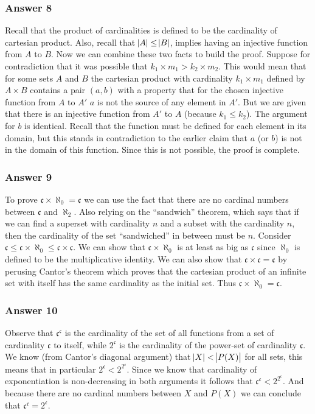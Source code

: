 \documentclass[11pt]{article}
\begin{document}
\subsubsection{Answer 8}
\label{sec-1-4-1}
Recall that the product of cardinalities is defined to be the cardinality of
cartesian product.  Also, recall that $\abs{A} \leq \abs{B}$, implies having
an injective function from $A$ to $B$.  Now we can combine these two facts
to build the proof.  Suppose for contradiction that it was possible that
$k_1 \times m_1 > k_2 \times m_2$.  This would mean that for some sets $A$
and $B$ the cartesian product with cardinality $k_1 \times m_1$ defined by
$A \times B$ contains a pair $(a, b)$ with a property that for the chosen
injective function from $A$ to $A'$ $a$ is not the source of any element in
$A'$. But we are given that there is an injective function from $A'$ to $A$
(because $k_1 \leq k_2$).  The argument for $b$ is identical.  Recall that
the function must be defined for each element in its domain, but this stands
in contradiction to the earlier claim that $a$ (or $b$) is not in the domain
of this function.  Since this is not possible, the proof is complete.
\subsubsection{Answer 9}
\label{sec-1-4-2}
To prove $\mathfrak{c} \times \aleph_0 = \mathfrak{c}$ we can use the fact
that there are no cardinal numbers between $\mathfrak{c}$ and $\aleph_2$.
Also relying on the ``sandwich'' theorem, which says that if we can find a
superset with cardinality $n$ and a subset with the cardinality $n$,
then the cardinality of the set ``sandwiched'' in between must be $n$.
Consider $\mathfrak{c} \leq \mathfrak{c} \times \aleph_0 \leq \mathfrak{c}
    \times \mathfrak{c}$.  We can show that $\mathfrak{c} \times \aleph_0$ is at
least as big as $\mathfrak{c}$ since $\aleph_0$ is defined to be the
multiplicative identity.  We can also show that $\mathfrak{c} \times
    \mathfrak{c} = \mathfrak{c}$ by perusing Cantor's theorem which proves that
the cartesian product of an infinite set with itself has the same cardinality
as the initial set.  Thus $\mathfrak{c} \times \aleph_0 = \mathfrak{c}$.
\subsubsection{Answer 10}
\label{sec-1-4-3}
Observe that $\mathfrak{c}^{\mathfrak{c}}$ is the cardinality of the set of
all functions from a set of cardinality $\mathfrak{c}$ to itself, while
$2^{\mathfrak{c}}$ is the cardinality of the power-set of cardinality
$\mathfrak{c}$.  We know (from Cantor's diagonal argument) that $\abs{X} <
    \abs{P(X)}$ for all sets, this means that in particular $2^{\mathfrak{c}} <
    2^{2^\mathfrak{c}}$.  Since we know that cardinality of exponentiation is
non-decreasing in both arguments it follows that $\mathfrak{c}^{
    \mathfrak{c}} < 2^{2^{\mathfrak{c}}}$.  And because there are no cardinal
numbers between $X$ and $P(X)$ we can conclude that
$\mathfrak{c}^{\mathfrak{c}} = 2^{\mathfrak{c}}$.
\end{document}
